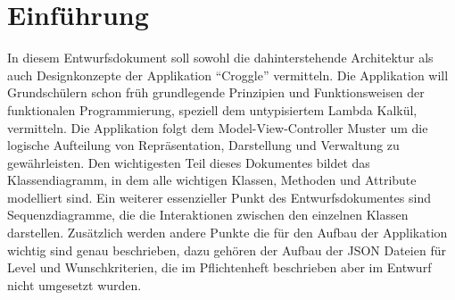 \chapter{Einführung}

In diesem Entwurfsdokument soll sowohl die dahinterstehende Architektur als auch Designkonzepte der Applikation "`Croggle"' vermitteln.
Die Applikation will Grundschülern schon früh grundlegende Prinzipien und Funktionsweisen der funktionalen Programmierung, speziell dem untypisiertem Lambda Kalkül, vermitteln.
Die Applikation folgt dem Model-View-Controller Muster um die logische Aufteilung von Repräsentation, Darstellung und Verwaltung zu gewährleisten.
Den wichtigesten Teil dieses Dokumentes bildet das Klassendiagramm, in dem alle wichtigen Klassen, Methoden und Attribute modelliert sind.
Ein weiterer essenzieller Punkt des Entwurfsdokumentes sind Sequenzdiagramme, die die Interaktionen zwischen den einzelnen Klassen darstellen.
Zusätzlich werden andere Punkte die für den Aufbau der Applikation wichtig sind genau beschrieben, dazu gehören der Aufbau der JSON Dateien für Level und Wunschkriterien, die im Pflichtenheft beschrieben aber im Entwurf nicht umgesetzt wurden.
